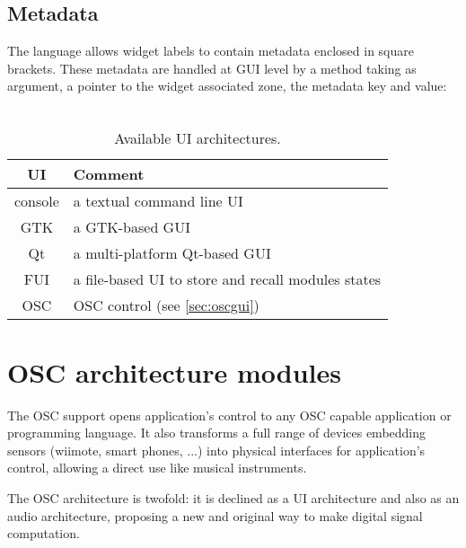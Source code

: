 \subsection{Metadata}
\label{sec:metadata}
The \faust language allows widget labels to contain metadata enclosed in square brackets. These metadata are handled at GUI level by a  method taking as argument, a pointer to the widget associated zone, the metadata key and value: \\
\htab{} \\


\begin{table}[htdp]
\begin{center}
\begin{tabular}{|c|l|}
\hline
\bf{UI} & \bf{Comment} \\
\hline
console  & a textual command line UI \\
GTK  & a GTK-based GUI \\
Qt   & a multi-platform Qt-based GUI \\
FUI  & a file-based UI to store and recall modules states \\
OSC  & OSC control (see \ref{sec:oscgui}) \\
\hline
\end{tabular}
\end{center}
\caption{Available UI architectures.}
\label{tab:uiarch}
\end{table}%


\section{OSC architecture modules} \label{sec:osc}

The OSC \cite{OSC} support opens \faust application's control to any OSC capable application or programming language.
It also transforms a full range of devices embedding sensors (wiimote, smart phones, ...) into physical interfaces for \faust application's control, allowing a direct use like musical instruments.

The \faust OSC architecture is twofold: it is declined as a UI architecture and also as an audio architecture, proposing a new and original way to make digital signal computation.

